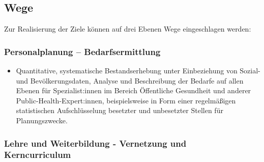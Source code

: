 \documentclass{article}
\begin{document}
\subsection{Wege}\label{H6656794}



Zur Realisierung der Ziele können auf drei Ebenen Wege eingeschlagen werden:


\subsubsection{Personalplanung – Bedarfsermittlung}\label{H7338081}


\begin{itemize}
\item Quantitative, systematische Bestandserhebung unter Einbeziehung von Sozial- und Bevölkerungsdaten, Analyse und Beschreibung der Bedarfe auf allen Ebenen für Spezialist:innen im Bereich Öffentliche Gesundheit und anderer Public-Health-Expert:innen, beispielsweise in Form einer regelmäßigen statistischen Aufschlüsselung besetzter und unbesetzter Stellen für Planungszwecke.


\end{itemize}

\subsubsection{Lehre und Weiterbildung - Vernetzung und Kerncurriculum }\label{H4073527}
\end{document}
